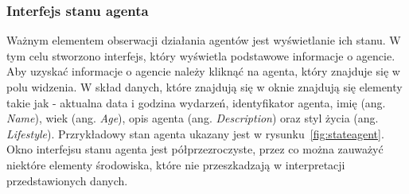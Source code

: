 \subsubsection{Interfejs stanu agenta}
Ważnym elementem obserwacji działania agentów jest wyświetlanie ich stanu. W tym celu stworzono interfejs, który wyświetla podstawowe informacje o agencie. Aby uzyskać informacje o agencie należy kliknąć na agenta, który znajduje się w polu widzenia. W skład danych, które znajdują się w oknie znajdują się elementy takie jak - aktualna data i godzina wydarzeń, identyfikator agenta, imię (ang. \textit{Name}), wiek (ang. \textit{Age}), opis agenta (ang. \textit{Description}) oraz styl życia (ang. \textit{Lifestyle}). Przrykładowy stan agenta ukazany jest w rysunku~\ref{fig:stateagent}. Okno interfejsu stanu agenta jest półprzezroczyste, przez co można zauważyć niektóre elementy środowiska, które nie przeszkadzają w interpretacji przedstawionych danych.
